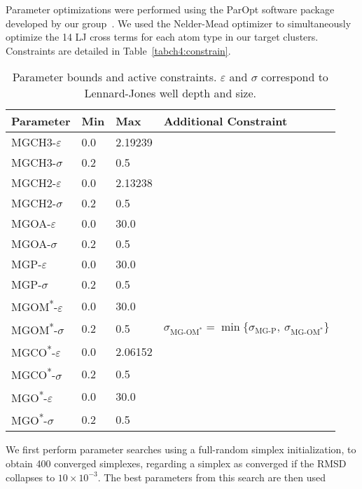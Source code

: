 Parameter optimizations were performed using the ParOpt software package developed by our group~\cite{fogarty:2014:paropt}. We used the Nelder-Mead optimizer to simultaneously optimize
the 14 LJ cross terms for each atom type in our target clusters. Constraints are detailed in Table~\ref{tabch4:constrain}. 
\begin{table}[h!]
    \tiny
\begin{tabularx}{\textwidth}{X|X|X|X}
\hline
\textbf{Parameter} & \textbf{Min} & \textbf{Max} & \textbf{Additional Constraint} \\
\hline
MGCH3-$\varepsilon$                   & 0.0 & 2.19239 & \\\hline
MGCH3-$\sigma$                        & 0.2 & 0.5     & \\\hline
MGCH2-$\varepsilon$                   & 0.0 & 2.13238 & \\\hline
MGCH2-$\sigma$                        & 0.2 & 0.5     & \\\hline
MGOA-$\varepsilon$                    & 0.0 & 30.0    & \\\hline
MGOA-$\sigma$                         & 0.2 & 0.5     & \\\hline
MGP-$\varepsilon$                     & 0.0 & 30.0    & \\\hline
MGP-$\sigma$                          & 0.2 & 0.5     & \\\hline
MGOM\textsuperscript{*}-$\varepsilon$ & 0.0 & 30.0    & \\\hline
MGOM\textsuperscript{*}-$\sigma$      & 0.2 & 0.5     & $\sigma_{\text{MG-OM}^*} = \min\big\{\sigma_{\text{MG-P}},\ \sigma_{\text{MG-OM}^*}\big\} $\\\hline
MGCO\textsuperscript{*}-$\varepsilon$ & 0.0 & 2.06152 & \\\hline
MGCO\textsuperscript{*}-$\sigma$      & 0.2 & 0.5     & \\\hline
MGO\textsuperscript{*}-$\varepsilon$  & 0.0 & 30.0    & \\\hline
MGO\textsuperscript{*}-$\sigma$       & 0.2 & 0.5     & \\\hline
\hline
\end{tabularx}
\caption[NM Constraints]{Parameter bounds and active constraints. $\varepsilon$ and $\sigma$ correspond to Lennard-Jones well depth and size.}
\label{tab:constrain}
\end{table}
We first perform parameter searches using a full-random simplex initialization, 
to obtain 400 converged simplexes, regarding a simplex as converged if the RMSD collapses to $10\times{}10^{-3}$. The best parameters from this search are then used
